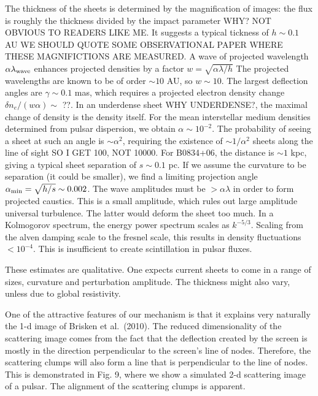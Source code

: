 \documentclass[useAMS,usenatbib]{mn2e}
\begin{document}
The thickness of the sheets is determined by the magnification of
images: the flux is roughly the thickness divided by the impact
parameter WHY? NOT OBVIOUS TO READERS LIKE ME.  
It suggests a typical tickness of $h\sim 0.1$ AU WE SHOULD QUOTE SOME
OBSERVATIONAL PAPER WHERE THESE MAGNIFICTIONS ARE MEASURED.  A wave
of projected wavelength $\alpha \lambda_{\rm wave}$ enhances projected densities
by a factor $w=\sqrt{\alpha\lambda/h}$  The projected wavelengths
are known to be of order $\sim 10$ AU, so $w \sim 10$.  The largest
deflection angles are $\gamma \sim 0.1$ mas, which requires a
projected electron density change $\delta n_e/(w\alpha) \sim$ ??.  In an
underdense sheet WHY UNDERDENSE?, the maximal change of density is the density itself.
For the mean interstellar medium densities determined from pulsar
dispersion, we obtain $\alpha \sim 10^{-2}$.  The probability of
seeing a sheet at such an angle is $\sim \alpha^2$, requiring the
existence of $\sim 1/\alpha^2$ sheets along the line of sight SO I GET 100, NOT
10000.  For
B0834+06, the distance is $\sim 1$ kpc, giving a typical sheet
separation of $s \sim 0.1$ pc.  If we assume the curvature to be
separation (it could be smaller), we find a limiting projection angle
$\alpha_{\rm min} = \sqrt{h/s} \sim 0.002$.  The wave amplitudes must
be $> \alpha \lambda$ in order to form projected caustics.  This is a
small amplitude, which rules out large amplitude universal turbulence.
The latter would deform the sheet too much.  In a Kolmogorov spectrum,
the energy power spectrum scales as $k^{-5/3}$.  Scaling from the
alven damping scale to the fresnel scale, this results in density
fluctuations $< 10^{-4}$.  This is insufficient to create
scintillation in pulsar fluxes.

These estimates are qualitative.  One expects current sheets to come
in a range of sizes, curvature and perturbation amplitude.  The
thickness might also vary, unless due to global resistivity.

One of the attractive features of our mechanism is that it explains very naturally the 1-d
image of Brisken et al.~(2010). The reduced dimensionality of the scattering image comes from the
fact that the deflection created by the screen is mostly in the direction perpendicular to the
screen's line of nodes. Therefore, the scattering clumps will also form a line that is perpendicular
to the line of nodes. This is demonstrated in Fig. 9, where we show a simulated 2-d scattering  image of
 a pulsar. The alignment of the scattering clumps is apparent.
\end{document}
